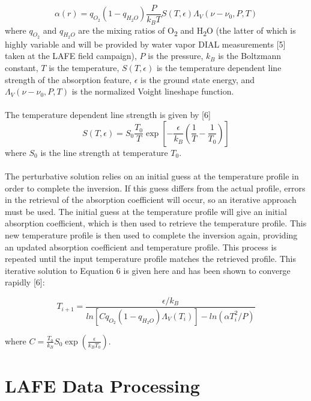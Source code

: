 \documentclass[twoside]{article}
\begin{document}
\begin{equation}
	\alpha (r) = q_{O_2} (1 - q_{H_2 O}) \frac{P}{k_B T} S(T,\epsilon) \Lambda_V(\nu - \nu_0,P,T)
\end{equation} 
\noindent where $q_{O_2}$ and $q_{H_2 O}$ are the mixing ratios of O\textsubscript{2} and H\textsubscript{2}O (the latter of which is highly variable and will be provided by water vapor DIAL measurements [5] taken at the LAFE field campaign), $P$ is the pressure, $k_B$ is the Boltzmann constant, $T$ is the temperature, $S(T,\epsilon)$ is the temperature dependent line strength of the absorption feature, $\epsilon$ is the ground state energy, and $\Lambda_V(\nu - \nu_0,P,T)$ is the normalized Voight lineshape function.
\\
\\
The temperature dependent line strength is given by [6]
\begin{equation}
	S(T,\epsilon) = S_0 \frac{T_0}{T} \exp \left[-\frac{\epsilon}{k_B}\left( \frac{1}{T}-\frac{1}{T_0}\right) \right]
\end{equation}
\noindent where $S_0$ is the line strength at temperature $T_0$. 
\\
\\
The perturbative solution relies on an initial guess at the temperature profile in order to complete the inversion. 
If this guess differs from the actual profile, errors in the retrieval of the absorption coefficient will occur, so an iterative approach must be used.
 The initial guess at the temperature profile will give an initial absorption coefficient, which is then used to retrieve the temperature profile. 
 This new temperature profile is then used to complete the inversion again, providing an updated absorption coefficient and temperature profile. 
 This process is repeated until the input temperature profile matches the retrieved profile. 
 This iterative solution to Equation 6 is given here and has been shown to converge rapidly [6]:

\begin{equation}
	T_{i+1} = \frac{\epsilon/k_B}{ln[C q_{O_2} (1 - q_{H_2 O}) \Lambda_V (T_i)] - ln(\alpha T_i^2 / P)}
\end{equation}

\noindent where $C = \frac{T_0}{k_B} S_0 \exp\left(\frac{\epsilon}{k_B T_0}\right)$.

\section{LAFE Data Processing}
\end{document}
